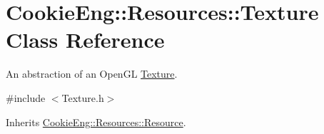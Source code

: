 \hypertarget{class_cookie_eng_1_1_resources_1_1_texture}{}\section{Cookie\+Eng\+:\+:Resources\+:\+:Texture Class Reference}
\label{class_cookie_eng_1_1_resources_1_1_texture}


An abstraction of an Open\+GL \hyperlink{class_cookie_eng_1_1_resources_1_1_texture}{Texture}.  




{\ttfamily \#include $<$Texture.\+h$>$}



Inherits \hyperlink{class_cookie_eng_1_1_resources_1_1_resource}{Cookie\+Eng\+::\+Resources\+::\+Resource}.


